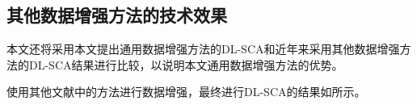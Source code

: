 {	\subsection{其他数据增强方法的技术效果}

	本文还将采用本文提出通用数据增强方法的DL-SCA和近年来采用其他数据增强方法的DL-SCA结果进行比较，以说明本文通用数据增强方法的优势。
	
	使用其他文献中的方法进行数据增强，最终进行DL-SCA的结果如所示。
	

}
